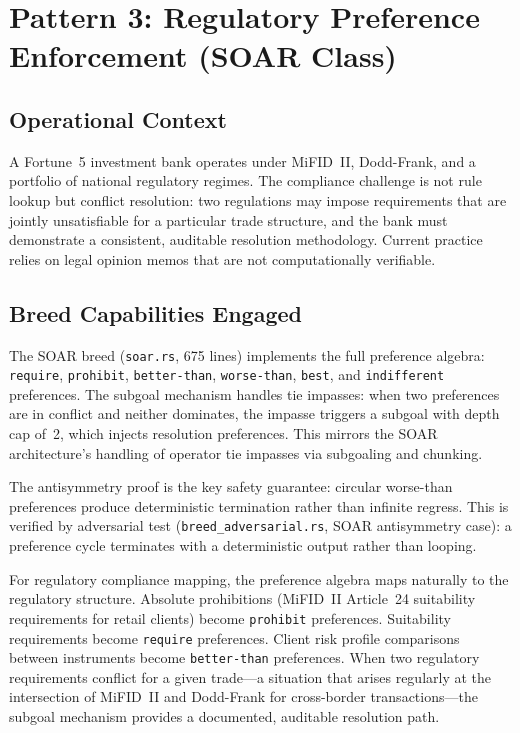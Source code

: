 \section{Pattern 3: Regulatory Preference Enforcement (SOAR Class)}
\label{sec:soar-deployment}

\subsection*{Operational Context}

A Fortune~5 investment bank operates under MiFID~II, Dodd-Frank, and a portfolio
of national regulatory regimes. The compliance challenge is not rule lookup but
conflict resolution: two regulations may impose requirements that are jointly
unsatisfiable for a particular trade structure, and the bank must demonstrate a
consistent, auditable resolution methodology. Current practice relies on legal
opinion memos that are not computationally verifiable.

\subsection*{Breed Capabilities Engaged}

The SOAR breed (\texttt{soar.rs}, 675 lines) implements the full preference algebra:
\texttt{require}, \texttt{prohibit}, \texttt{better-than}, \texttt{worse-than},
\texttt{best}, and \texttt{indifferent} preferences. The subgoal mechanism handles
tie impasses: when two preferences are in conflict and neither dominates, the
impasse triggers a subgoal with depth cap of~2, which injects resolution preferences.
This mirrors the SOAR architecture's handling of operator tie impasses via
subgoaling and chunking.

The antisymmetry proof is the key safety guarantee: circular worse-than preferences
produce deterministic termination rather than infinite regress. This is verified
by adversarial test (\texttt{breed\_adversarial.rs}, SOAR antisymmetry case): a
preference cycle terminates with a deterministic output rather than looping.

For regulatory compliance mapping, the preference algebra maps naturally to the
regulatory structure. Absolute prohibitions (MiFID~II Article~24 suitability
requirements for retail clients) become \texttt{prohibit} preferences. Suitability
requirements become \texttt{require} preferences. Client risk profile comparisons
between instruments become \texttt{better-than} preferences. When two regulatory
requirements conflict for a given trade---a situation that arises regularly at
the intersection of MiFID~II and Dodd-Frank for cross-border transactions---the
subgoal mechanism provides a documented, auditable resolution path.

